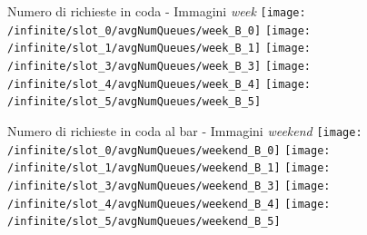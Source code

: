 \documentclass[xcolor=table]{beamer}
\begin{document}
\begin{frame}{Numero di richieste in coda - Immagini \textit{week}}\justifying
\centering
\texttt{[image: /infinite/slot\_0/avgNumQueues/week\_B\_0]}
\texttt{[image: /infinite/slot\_1/avgNumQueues/week\_B\_1]}
\texttt{[image: /infinite/slot\_3/avgNumQueues/week\_B\_3]}
\texttt{[image: /infinite/slot\_4/avgNumQueues/week\_B\_4]}
\texttt{[image: /infinite/slot\_5/avgNumQueues/week\_B\_5]}
\end{frame}
\begin{frame}{Numero di richieste in coda al bar - Immagini \textit{weekend}}\justifying
\centering
\texttt{[image: /infinite/slot\_0/avgNumQueues/weekend\_B\_0]}
\texttt{[image: /infinite/slot\_1/avgNumQueues/weekend\_B\_1]}
\texttt{[image: /infinite/slot\_3/avgNumQueues/weekend\_B\_3]}
\texttt{[image: /infinite/slot\_4/avgNumQueues/weekend\_B\_4]}
\texttt{[image: /infinite/slot\_5/avgNumQueues/weekend\_B\_5]}
\end{frame}
\end{document}
